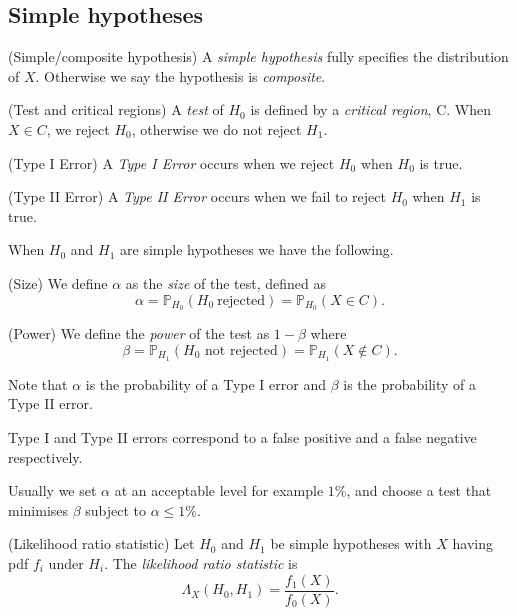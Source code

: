 \documentclass{article}
\begin{document}
\subsection{Simple hypotheses}
\begin{definition}
	(Simple/composite hypothesis) A \textit{simple hypothesis} fully specifies the distribution of $ X $. Otherwise we say the hypothesis is \textit{composite}.
\end{definition}
\begin{definition}
	(Test and critical regions) A \textit{test} of $ H_0 $ is defined by a \textit{critical region}, C. When $ X\in C $, we reject $ H_0 $, otherwise we do not reject $ H_1 $.
\end{definition}
\begin{definition}
	(Type I Error) A \textit{Type I Error} occurs when we reject $ H_0 $ when $ H_0 $ is true.
\end{definition}
\begin{definition}
	(Type II Error) A \textit{Type II Error} occurs when we fail to reject $ H_0 $ when $ H_1 $ is true.
\end{definition}
When $ H_0 $ and $ H_1 $ are simple hypotheses we have the following.
\begin{definition}
	(Size) We define $ \alpha $ as the \textit{size} of the test, defined as
	\[
		\alpha = \mathbb P_{H_0}(H_0\ \text{rejected}) = \mathbb P_{H_0}(X\in C).
	\]
\end{definition}
\begin{definition}
	(Power) We define the \textit{power} of the test as $ 1-\beta $ where
	\[
		\beta = \mathbb P_{H_1}(H_0\text{ not rejected}) = \mathbb P_{H_1}(X\notin C).
	\]
\end{definition}
\begin{remark}
  Note that $ \alpha $ is the probability of a Type I error and $ \beta $ is the probability of a Type II error.
\end{remark}
\begin{remark}
  Type I and Type II errors correspond to a false positive and a false negative respectively.
\end{remark}
Usually we set $ \alpha $ at an acceptable level for example $ 1\% $, and choose a test that minimises $ \beta $ subject to $ \alpha\le 1\% $.
\begin{definition}
	(Likelihood ratio statistic) Let $ H_0 $ and $ H_1 $ be simple hypotheses with $ X $ having pdf $ f_i $ under $ H_i $. The \textit{likelihood ratio statistic} is
	\[
		\Lambda_X(H_0,H_1) = \frac{f_1(X)}{f_0(X)}.
	\]
\end{definition}
\end{document}
